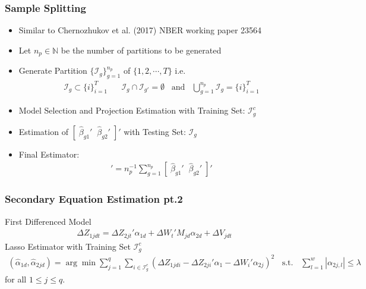 \documentclass[9pt]{beamer}
\begin{document}
\begin{frame} 
\frametitle{Sample Splitting} 

\begin{itemize}  \addtolength{\itemsep}{\baselineskip}
      \item Similar to Chernozhukov et al. (2017) NBER working paper 23564
	\item Let $n_p \in \mathbb{N}$ be the number of partitions to be generated
	\item Generate Partition $\{\mathcal{I}_g\}_{g=1}^{n_p}$ of $\{1,2,\cdots,T\}$ i.e.
	\begin{align*}
	\mathcal{I}_g \subset \{i\}_{i=1}^{T} \;\;\;\;\;\; \mathcal{I}_g \cap \mathcal{I}_{g'} = \emptyset \;\;\; \text{and} \;\;\;  \bigcup_{g=1}^{n_p} \mathcal{I}_g = \{i\}_{i=1}^{T}
	\end{align*}
       \item Model Selection and Projection Estimation with Training Set: $\mathcal{I}^c_g$
       \item Estimation of $[ \; \hat{\beta} _{g1}' \;\; \hat{\beta}_{g2}' \;]'$ with Testing Set: $\mathcal{I}_g$  
       \item Final Estimator:
       \begin{align*}
        [ \; \hat{\beta} _{1}' \;\; \hat{\beta}_{2}' \;]' = n_p^{-1} \sum_{g=1}^{n_p} [ \; \hat{\beta} _{g1}' \;\; \hat{\beta}_{g2}' \;]'
       \end{align*}
 
\end{itemize} 

\end{frame}



\begin{frame} 
\frametitle{Secondary Equation Estimation pt.2} 

First Differenced Model
\begin{align*} 
\Delta Z_{1jdt} =\Delta Z_{2jt}' \alpha_{1d} + \Delta W_{t}'M_{jd} \alpha_{2d} + \Delta V_{jdt}
\end{align*}
Lasso Estimator with Training Set $\mathcal{I}^c_g$
\begin{align*} 
(\hat{\alpha}_{1d},\hat{\alpha}_{2jd})  = \arg \min \sum_{j=1}^q\sum_{i \in \mathcal{I}^c_g}\left( \Delta Z_{1jdi} -  \Delta Z_{2ji}'\alpha_{1} - \Delta W_{i}'\alpha_{2j} \right)^2 \;\; \text{ s.t. } \;\; \sum_{l=1}^w|\alpha_{2j,l}| \leq \lambda 
\end{align*}
for all $1 \leq j \leq q$.  

\end{frame}
\end{document}
